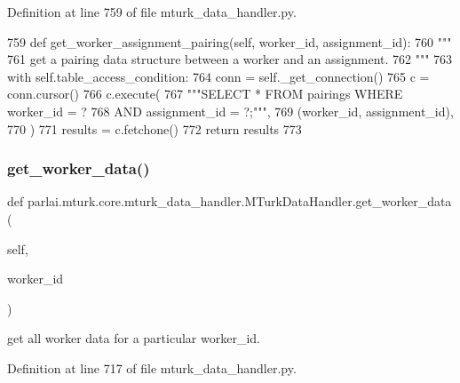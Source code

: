 Definition at line 759 of file mturk\+\_\+data\+\_\+handler.\+py.


\begin{DoxyCode}
759     \textcolor{keyword}{def }get\_worker\_assignment\_pairing(self, worker\_id, assignment\_id):
760         \textcolor{stringliteral}{"""}
761 \textcolor{stringliteral}{        get a pairing data structure between a worker and an assignment.}
762 \textcolor{stringliteral}{        """}
763         with self.table\_access\_condition:
764             conn = self.\_get\_connection()
765             c = conn.cursor()
766             c.execute(
767                 \textcolor{stringliteral}{"""SELECT * FROM pairings WHERE worker\_id = ?}
768 \textcolor{stringliteral}{                         AND assignment\_id = ?;"""},
769                 (worker\_id, assignment\_id),
770             )
771             results = c.fetchone()
772             \textcolor{keywordflow}{return} results
773 
\end{DoxyCode}
\mbox{\label{classparlai_1_1mturk_1_1core_1_1mturk__data__handler_1_1MTurkDataHandler_a45c012ee9fa36a52f9286ccc3ab1be3a}} 
\subsubsection{\texorpdfstring{get\+\_\+worker\+\_\+data()}{get\_worker\_data()}}
{\footnotesize\ttfamily def parlai.\+mturk.\+core.\+mturk\+\_\+data\+\_\+handler.\+M\+Turk\+Data\+Handler.\+get\+\_\+worker\+\_\+data (\begin{DoxyParamCaption}\item[{}]{self,  }\item[{}]{worker\+\_\+id }\end{DoxyParamCaption})}

\begin{DoxyVerb}get all worker data for a particular worker_id.
\end{DoxyVerb}
 

Definition at line 717 of file mturk\+\_\+data\+\_\+handler.\+py.


